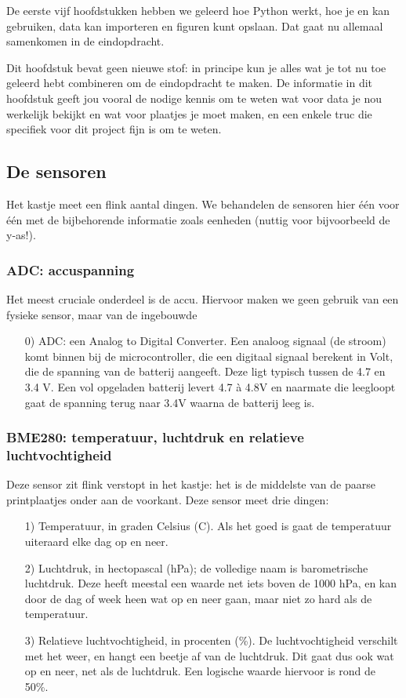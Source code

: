 \documentclass[a4paper,11pt, fleqn]{article}
\begin{document}
De eerste vijf hoofdstukken hebben we geleerd hoe Python werkt, hoe je  en  kan gebruiken, data kan importeren en figuren kunt opslaan. Dat gaat nu allemaal samenkomen in de eindopdracht.

Dit hoofdstuk bevat geen nieuwe stof: in principe kun je alles wat je tot nu toe geleerd hebt combineren om de eindopdracht te maken. De informatie in dit hoofdstuk geeft jou vooral de nodige kennis om te weten wat voor data je nou werkelijk bekijkt en wat voor plaatjes je moet maken, en een enkele truc die specifiek voor dit project fijn is om te weten.

\subsection{De sensoren}
Het kastje meet een flink aantal dingen. We behandelen de sensoren hier \'e\'en voor \'e\'en met de bijbehorende informatie zoals eenheden (nuttig voor bijvoorbeeld de y-as!).

\subsubsection{ADC: accuspanning}
Het meest cruciale onderdeel is de accu. Hiervoor maken we geen gebruik van een fysieke sensor, maar van de ingebouwde
\begin{itemize}
	\item[0)] ADC: een Analog to Digital Converter. Een analoog signaal (de stroom) komt binnen bij de microcontroller, die een digitaal signaal berekent in Volt, die de spanning van de batterij aangeeft. Deze ligt typisch tussen de 4.7 en 3.4 V. Een vol opgeladen batterij levert 4.7 \`a 4.8V en naarmate die leegloopt gaat de spanning terug naar 3.4V waarna de batterij leeg is.
\end{itemize}

\subsubsection{BME280: temperatuur, luchtdruk en relatieve luchtvochtigheid}
Deze sensor zit flink verstopt in het kastje: het is de middelste van de paarse printplaatjes onder aan de voorkant. Deze sensor meet drie dingen:
\begin{itemize}
	\item[1)] Temperatuur, in graden Celsius (\textdegree C). Als het goed is gaat de temperatuur uiteraard elke dag op en neer.
	\item[2)] Luchtdruk, in hectopascal (hPa); de volledige naam is barometrische luchtdruk. Deze heeft meestal een waarde net iets boven de 1000 hPa, en kan door de dag of week heen wat op en neer gaan, maar niet zo hard als de temperatuur.
	\item[3)] Relatieve luchtvochtigheid, in procenten (\%). De luchtvochtigheid verschilt met het weer, en hangt een beetje af van de luchtdruk. Dit gaat dus ook wat op en neer, net als de luchtdruk. Een logische waarde hiervoor is rond de 50\%.
\end{itemize}
\end{document}
